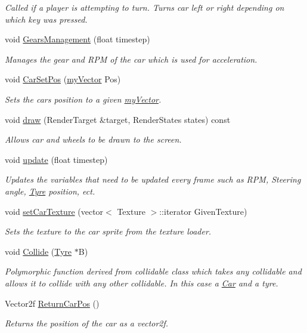 \begin{DoxyCompactItemize}
\begin{DoxyCompactList}\small\item\em Called if a player is attempting to turn. Turns car left or right depending on which key was pressed. \end{DoxyCompactList}\item 
void \hyperlink{class_car_a17070db3aab0bd07fc7aa33014577c44}{Gears\+Management} (float timestep)
\begin{DoxyCompactList}\small\item\em Manages the gear and R\+P\+M of the car which is used for acceleration. \end{DoxyCompactList}\item 
void \hyperlink{class_car_a00b4b7e97883fe68f6b6ce0cb314ac1d}{Car\+Set\+Pos} (\hyperlink{classmy_vector}{my\+Vector} Pos)
\begin{DoxyCompactList}\small\item\em Sets the car\textquotesingle{}s position to a given \hyperlink{classmy_vector}{my\+Vector}. \end{DoxyCompactList}\item 
void \hyperlink{class_car_a61fa68cf77c965400f16546a75278466}{draw} (Render\+Target \&target, Render\+States states) const 
\begin{DoxyCompactList}\small\item\em Allows car and wheels to be drawn to the screen. \end{DoxyCompactList}\item 
void \hyperlink{class_car_afe9470e7880c07e082633d900328b312}{update} (float timestep)
\begin{DoxyCompactList}\small\item\em Updates the variables that need to be updated every frame such as R\+P\+M, Steering angle, \hyperlink{class_tyre}{Tyre} position, ect. \end{DoxyCompactList}\item 
void \hyperlink{class_car_a6a4377866be6ad14841bb70f87a68327}{set\+Car\+Texture} (vector$<$ Texture $>$\+::iterator Given\+Texture)
\begin{DoxyCompactList}\small\item\em Sets the texture to the car sprite from the texture loader. \end{DoxyCompactList}\item 
void \hyperlink{class_car_abf01c052dd364f40cfbc2881b79b5ea4}{Collide} (\hyperlink{class_tyre}{Tyre} $\ast$B)
\begin{DoxyCompactList}\small\item\em Polymorphic function derived from collidable class which takes any collidable and allows it to collide with any other collidable. In this case a \hyperlink{class_car}{Car} and a tyre. \end{DoxyCompactList}\item 
Vector2f \hyperlink{class_car_aa54320ce418c1f377eb595853dd1939c}{Return\+Car\+Pos} ()
\begin{DoxyCompactList}\small\item\em Returns the position of the car as a vector2f. \end{DoxyCompactList}\end{DoxyCompactItemize}
